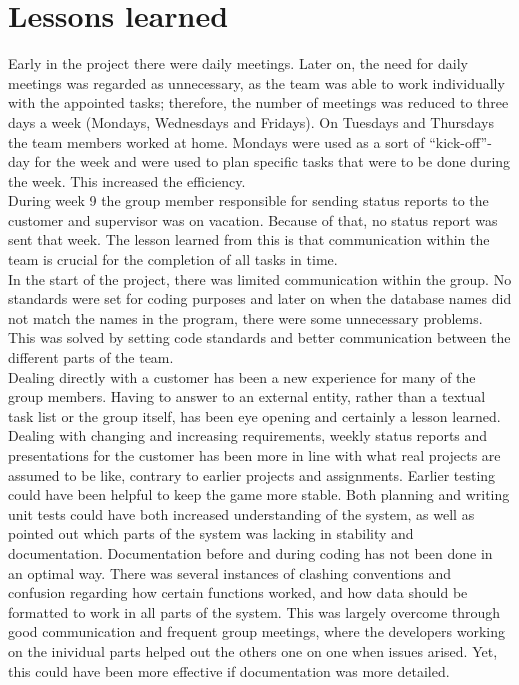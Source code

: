 \section{Lessons learned}

Early in the project there were daily meetings. Later on, the need for daily meetings was regarded as unnecessary, as the team was able to work individually with the appointed tasks; therefore, the number of meetings was reduced to three days a week (Mondays, Wednesdays and Fridays). On Tuesdays and Thursdays the team members worked at home. Mondays were used as a sort of “kick-off”-day for the week and were used to plan specific tasks that were to be done during the week. This increased the efficiency.\\
\newline
During week 9 the group member responsible for sending status reports to the customer and supervisor was on vacation. Because of that, no status report was sent that week. The lesson learned from this is that communication within the team is crucial for the completion of all tasks in time.\\
\newline
In the start of the project, there was limited communication within the group. No standards were set
for coding purposes and later on when the database names did not match the names in the program, there were some unnecessary problems. This was solved by setting code standards and better communication between the different parts of the team. \\
\newline
Dealing directly with a customer has been a new experience for many of the group members. Having to answer to an external entity, rather than a textual task list or the group itself, has been eye opening and certainly a lesson learned. Dealing with changing and increasing requirements, weekly status reports and presentations for the customer has been more in line with what real projects are assumed to be like, contrary to earlier projects and assignments.
\newline
Earlier testing could have been helpful to keep the game more stable. Both planning and writing unit tests could have both increased understanding of the system, as well as pointed out which parts of the system was lacking in stability and documentation. 
\newline
Documentation before and during coding has not been done in an optimal way. There was several instances of clashing conventions and confusion regarding how certain functions worked, and how data should be formatted to work in all parts of the system. This was largely overcome through good communication and frequent group meetings, where the developers working on the inividual parts helped out the others one on one when issues arised. Yet, this could have been more effective if documentation was more detailed.






